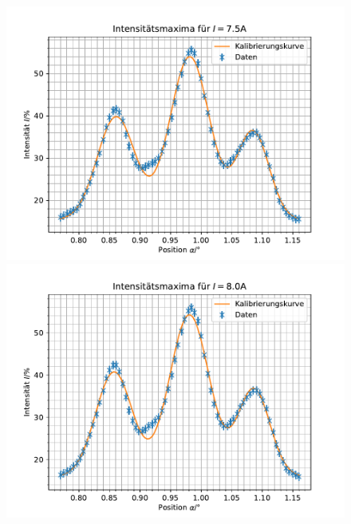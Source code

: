 \documentclass{article}
\begin{document}
\begin{figure}[h]
  \centering
  \begin{minipage}{.49\linewidth}
    \centering
    \includegraphics[width=\linewidth]{gauss_7.5A.pdf}
  \end{minipage}
  \hfill
  \begin{minipage}{.49\linewidth}
    \centering
    \includegraphics[width=\linewidth]{gauss_8.0A.pdf}
  \end{minipage}


\end{figure}
\end{document}
